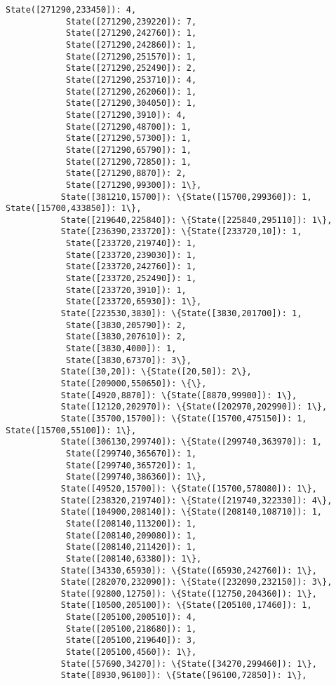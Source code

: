 \documentclass[11pt]{article}
\begin{document}
\begin{Verbatim}[commandchars=\\\{\}]
            State([271290,233450]): 4,
            State([271290,239220]): 7,
            State([271290,242760]): 1,
            State([271290,242860]): 1,
            State([271290,251570]): 1,
            State([271290,252490]): 2,
            State([271290,253710]): 4,
            State([271290,262060]): 1,
            State([271290,304050]): 1,
            State([271290,3910]): 4,
            State([271290,48700]): 1,
            State([271290,57300]): 1,
            State([271290,65790]): 1,
            State([271290,72850]): 1,
            State([271290,8870]): 2,
            State([271290,99300]): 1\},
           State([381210,15700]): \{State([15700,299360]): 1, State([15700,433850]): 1\},
           State([219640,225840]): \{State([225840,295110]): 1\},
           State([236390,233720]): \{State([233720,10]): 1,
            State([233720,219740]): 1,
            State([233720,239030]): 1,
            State([233720,242760]): 1,
            State([233720,252490]): 1,
            State([233720,3910]): 1,
            State([233720,65930]): 1\},
           State([223530,3830]): \{State([3830,201700]): 1,
            State([3830,205790]): 2,
            State([3830,207610]): 2,
            State([3830,4000]): 1,
            State([3830,67370]): 3\},
           State([30,20]): \{State([20,50]): 2\},
           State([209000,550650]): \{\},
           State([4920,8870]): \{State([8870,99900]): 1\},
           State([12120,202970]): \{State([202970,202990]): 1\},
           State([35700,15700]): \{State([15700,475150]): 1, State([15700,55100]): 1\},
           State([306130,299740]): \{State([299740,363970]): 1,
            State([299740,365670]): 1,
            State([299740,365720]): 1,
            State([299740,386360]): 1\},
           State([49520,15700]): \{State([15700,578080]): 1\},
           State([238320,219740]): \{State([219740,322330]): 4\},
           State([104900,208140]): \{State([208140,108710]): 1,
            State([208140,113200]): 1,
            State([208140,209080]): 1,
            State([208140,211420]): 1,
            State([208140,63380]): 1\},
           State([34330,65930]): \{State([65930,242760]): 1\},
           State([282070,232090]): \{State([232090,232150]): 3\},
           State([92800,12750]): \{State([12750,204360]): 1\},
           State([10500,205100]): \{State([205100,17460]): 1,
            State([205100,200510]): 4,
            State([205100,218680]): 1,
            State([205100,219640]): 3,
            State([205100,4560]): 1\},
           State([57690,34270]): \{State([34270,299460]): 1\},
           State([8930,96100]): \{State([96100,72850]): 1\},

\end{Verbatim}
\end{document}
